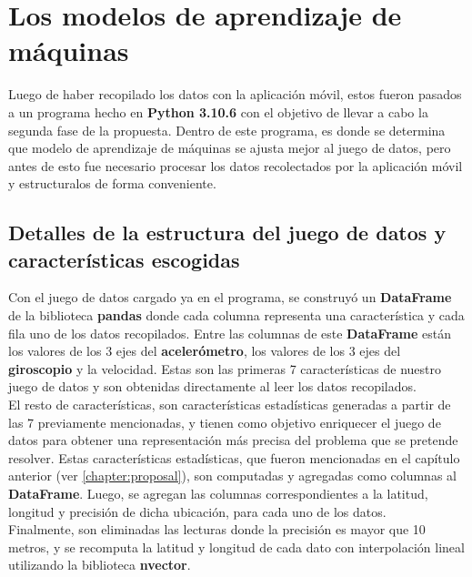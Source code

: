 \section{Los modelos de aprendizaje de máquinas}
	Luego de haber recopilado los datos con la aplicación móvil, estos fueron pasados a un programa hecho en \textbf{Python 3.10.6} con el objetivo de llevar a cabo 
	la segunda fase de la propuesta. Dentro de este programa, es donde se determina que modelo de aprendizaje de máquinas se ajusta mejor al juego de datos,
	pero antes de esto fue necesario procesar los datos recolectados por la aplicación móvil y estructuralos de forma conveniente. 

	\subsection{Detalles de la estructura del juego de datos y características escogidas}
		Con el juego de datos cargado ya en el programa, se construyó un \textbf{DataFrame} de la biblioteca \textbf{pandas} donde cada columna representa
		una característica y cada fila uno de los datos recopilados. Entre las columnas de este \textbf{DataFrame} están los valores de los 3 ejes del \textbf
		{acelerómetro}, los valores de los 3 ejes del \textbf{giroscopio} y la velocidad. Estas son las primeras 7 características de nuestro juego de datos
		y son obtenidas directamente al leer los datos recopilados.\\
		\indent El resto de características, son características estadísticas generadas a partir de las 7 previamente mencionadas, y tienen como objetivo
		enriquecer el juego de datos para obtener una representación más precisa del problema que se pretende resolver. Estas características estadísticas,
		que fueron mencionadas en el capítulo anterior (ver \ref{chapter:proposal}), son computadas y agregadas como columnas al \textbf{DataFrame}.
		Luego, se agregan las columnas correspondientes a la latitud, longitud y precisión de dicha ubicación, para cada uno de los datos.\\
		\indent Finalmente, son eliminadas las lecturas donde la precisión es mayor que 10 metros, y se recomputa la latitud y longitud de cada dato con
		interpolación lineal utilizando la biblioteca \textbf{nvector}.

